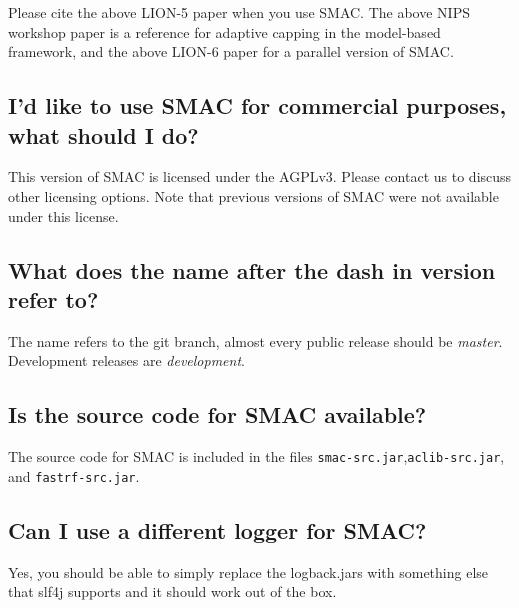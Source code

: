 \documentclass[11pt,letterpaper,oneside]{article}
\begin{document}
Please cite the above LION-5 paper when you use SMAC.
The above NIPS workshop paper is a reference for adaptive capping in the model-based framework, and the above LION-6 paper for a parallel version of SMAC.

\subsection{I'd like to use SMAC for commercial purposes, what should I do?}

This version of SMAC is licensed under the AGPLv3. Please contact us to discuss other licensing options. Note that previous versions of SMAC were not available under this license.
	
\subsection{What does the name after the dash in version refer to?}

	The name refers to the git branch, almost every public release should be \textit{master}. Development releases are \textit{development}. 

\subsection{Is the source code for SMAC available?}

	The source code for SMAC is included in the files \texttt{smac-src.jar},\texttt{aclib-src.jar}, and \texttt{fastrf-src.jar}.
	
\subsection{Can I use a different logger for SMAC?}

	Yes, you should be able to simply replace the logback.jars with something else that slf4j supports and it should work out of the box. 
\end{document}
